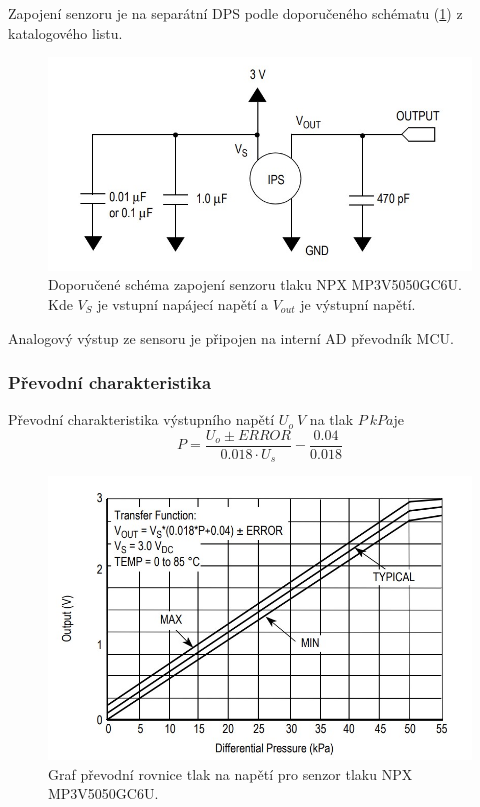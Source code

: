 Zapojení senzoru je na separátní DPS podle doporučeného schématu (\ref{fig:nxp_recommended}) z katalogového listu.
\begin{figure}[H]
    \centering
    \includegraphics[width=0.9\linewidth]{pictures/nxp_recommended.jpg}
    \caption{Doporučené schéma zapojení senzoru tlaku NPX MP3V5050GC6U. Kde $V_S$ je vstupní napájecí napětí a $V_{out}$ je výstupní napětí.  \cite{cite:NXP}}
    \label{fig:nxp_recommended}
\end{figure}
Analogový výstup ze sensoru je připojen na interní AD převodník MCU.
\subsubsection{Převodní charakteristika}
Převodní charakteristika výstupního napětí $U_{o} \ V$ na tlak $P \ kPa$je
\begin{equation}
    P = \frac{U_o \pm ERROR}{0.018 \cdot U_s} - \frac{0.04}{0.018}
    \label{eq:nxp_transfer}
\end{equation}

\begin{figure}[H]
    \centering
    \includegraphics[width=0.9\linewidth]{pictures/nxp_transfer.jpg}
    \caption{Graf převodní rovnice tlak na napětí pro senzor tlaku NPX MP3V5050GC6U. \cite{cite:NXP}}
    \label{fig:nxp_transfer}
\end{figure}

